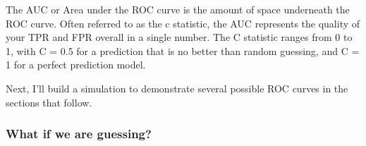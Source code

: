 \documentclass[]{book}
\newenvironment{Shaded}{\begin{snugshade}}{\end{snugshade}}
\newcommand{\KeywordTok}[1]{\textcolor[rgb]{0.13,0.29,0.53}{\textbf{#1}}}
\newcommand{\DataTypeTok}[1]{\textcolor[rgb]{0.13,0.29,0.53}{#1}}
\newcommand{\DecValTok}[1]{\textcolor[rgb]{0.00,0.00,0.81}{#1}}
\newcommand{\FloatTok}[1]{\textcolor[rgb]{0.00,0.00,0.81}{#1}}
\newcommand{\StringTok}[1]{\textcolor[rgb]{0.31,0.60,0.02}{#1}}
\newcommand{\OperatorTok}[1]{\textcolor[rgb]{0.81,0.36,0.00}{\textbf{#1}}}
\newcommand{\NormalTok}[1]{#1}
\theoremstyle{definition}
\theoremstyle{definition}
\theoremstyle{definition}
\theoremstyle{remark}
\begin{document}
The AUC or Area under the ROC curve is the amount of space underneath
the ROC curve. Often referred to as the c statistic, the AUC represents
the quality of your TPR and FPR overall in a single number. The C
statistic ranges from 0 to 1, with C = 0.5 for a prediction that is no
better than random guessing, and C = 1 for a perfect prediction model.

Next, I'll build a simulation to demonstrate several possible ROC curves
in the sections that follow.

\begin{Shaded}
\end{Shaded}

\subsubsection{What if we are guessing?}\label{what-if-we-are-guessing}
\end{document}
